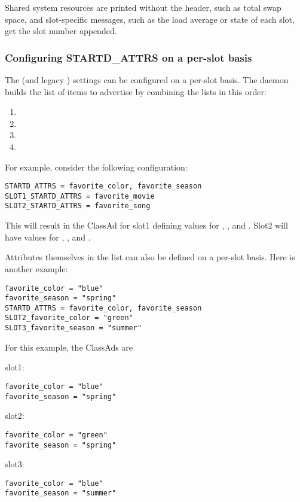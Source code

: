 Shared system resources are printed without the header,
such as total swap space,
and slot-specific messages,
such as the load average or state of each slot,
get the slot number appended.  


\subsubsection{\label{sec:SMP-exprs}
Configuring STARTD\_ATTRS on a per-slot basis}

The  (and legacy ) settings
can be configured on a per-slot basis.
The  daemon builds the list of items to
advertise by combining the lists in this order:
\begin{enumerate}
\item{}
\item{}
\item{}
\item{}
\end{enumerate}

For example, consider the following configuration:
\begin{verbatim}
STARTD_ATTRS = favorite_color, favorite_season
SLOT1_STARTD_ATTRS = favorite_movie
SLOT2_STARTD_ATTRS = favorite_song
\end{verbatim}

This will result in the  ClassAd for
slot1 defining values for
, ,
and .
Slot2 will have values for
, , and .

Attributes themselves in the  list
can also be defined on a per-slot basis.
Here is another example:

\begin{verbatim}
favorite_color = "blue"
favorite_season = "spring"
STARTD_ATTRS = favorite_color, favorite_season
SLOT2_favorite_color = "green"
SLOT3_favorite_season = "summer"
\end{verbatim}

For this example, the  ClassAds are
\begin{description}
\item{slot1}:
\begin{verbatim}
favorite_color = "blue"
favorite_season = "spring"
\end{verbatim}
\item{slot2}:
\begin{verbatim}
favorite_color = "green"
favorite_season = "spring"
\end{verbatim}
\item{slot3}:
\begin{verbatim}
favorite_color = "blue"
favorite_season = "summer"
\end{verbatim}
\end{description}

